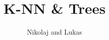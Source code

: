\documentclass[12pt,a4paper]{beamer}
\begin{document}
\begin{frame}
\author{Nikolaj and Lukas}
\title{K-NN \& Trees}
\maketitle
\end{frame}

\centering



% 
% 
% 
% 
% 
% 

\end{document}
